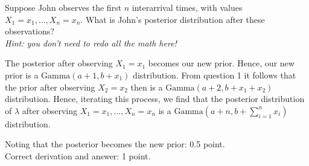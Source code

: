 \begin{exercise}[1.5]
Suppose John observes the first $n$ interarrival times, with values $X_1 = x_1, \ldots, X_n = x_n$. What is John's posterior distribution after these observations? \\
\textit{Hint: you don't need to redo all the math here!}
\begin{solution}
The posterior after observing $X_1 = x_1$ becomes our new prior. Hence, our new prior is a $\text{Gamma}(a+1,b+x_1)$ distribution. From question 1 it follows that the prior after observing $X_2 = x_2$ then is a $\text{Gamma}(a+2,b+x_1 + x_2)$ distribution. Hence, iterating this process, we find that the posterior distribution of $\lambda$ after observing $X_1 = x_1, \ldots, X_n = x_n$ is a $\text{Gamma}(a+n,b+ \sum_{i=1}^n x_i)$ distribution.

Noting that the posterior becomes the new prior: 0.5 point.\\
Correct derivation and answer: 1 point.
\end{solution}
\end{exercise}